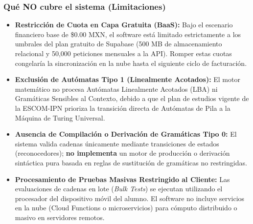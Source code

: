 \subsubsection{Qué NO cubre el sistema (Limitaciones)}
\begin{itemize}
    \item \textbf{Restricción de Cuota en Capa Gratuita (BaaS):} Bajo el escenario financiero base de \$0.00 MXN, el software está limitado estrictamente a los umbrales del plan gratuito de Supabase (500 MB de almacenamiento relacional y 50,000 peticiones mensuales a la API). Romper estas cuotas congelaría la sincronización en la nube hasta el siguiente ciclo de facturación.
    \item \textbf{Exclusión de Autómatas Tipo 1 (Linealmente Acotados):} El motor matemático no procesa Autómatas Linealmente Acotados (LBA) ni Gramáticas Sensibles al Contexto, debido a que el plan de estudios vigente de la ESCOM-IPN prioriza la transición directa de Autómatas de Pila a la Máquina de Turing Universal.
    \item \textbf{Ausencia de Compilación o Derivación de Gramáticas Tipo 0:} El sistema valida cadenas únicamente mediante transiciones de estados (reconocedores); \textbf{no implementa} un motor de producción o derivación sintáctica pura basada en reglas de sustitución de gramáticas no restringidas.
    \item \textbf{Procesamiento de Pruebas Masivas Restringido al Cliente:} Las evaluaciones de cadenas en lote (\textit{Bulk Tests}) se ejecutan utilizando el procesador del dispositivo móvil del alumno. El software no incluye servicios en la nube (Cloud Functions o microservicios) para cómputo distribuido o masivo en servidores remotos.
\end{itemize}